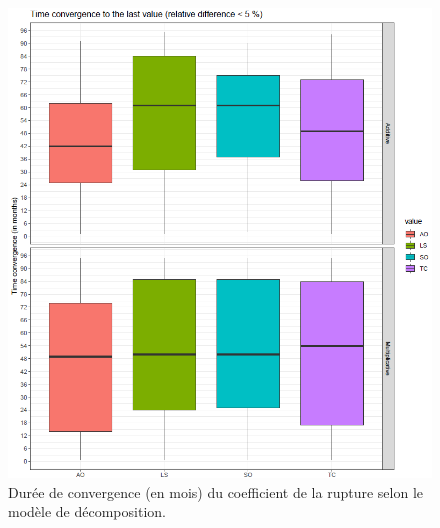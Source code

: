 \documentclass[12pt, a4paper, french]{article}
\begin{document}
\begin{figure}[h!]
\begin{center}
 \includegraphics[scale=0.65]{img/OutliersConvergence.png}
 \caption[Durée de convergence (en mois) du coefficient de la rupture selon le modèle de décomposition]{Durée de convergence (en mois) du coefficient de la rupture selon le modèle de décomposition.}
 \label{fig:OutliersConvergence}
\end{center}
\end{figure}
\end{document}
